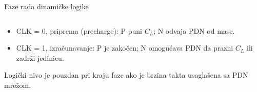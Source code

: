 \begin{frame}[label=09_3-s069]{Faze rada dinamičke logike}
\begin{columns}[c,onlytextwidth]
\begin{center}

\end{center}
\begin{center}

\end{center}
\end{columns}\begin{itemize}
\item \alert{CLK = 0, priprema (precharge):} P puni $C_L$; N odvaja PDN od mase.
\item \alert{CLK = 1, izračunavanje:} P je zakočen; N omogućava PDN da prazni $C_L$ ili zadrži jedinicu.
\end{itemize}
Logički nivo je pouzdan pri kraju faze ako je brzina takta usaglašena sa PDN mrežom.
\end{frame}
